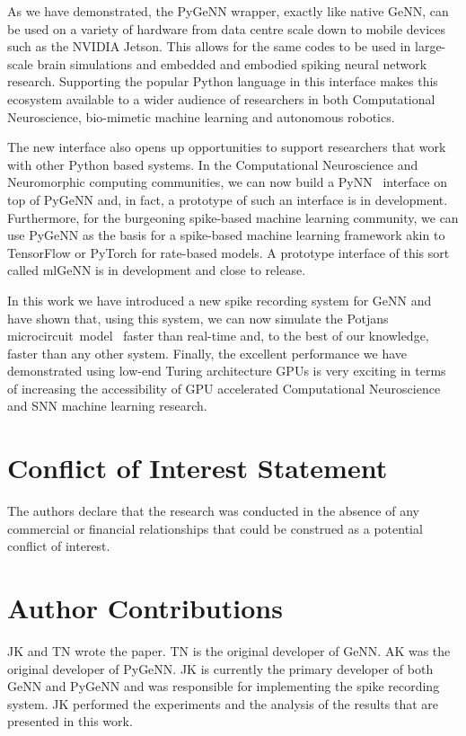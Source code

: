 \documentclass[utf8]{frontiersSCNS} %
\begin{document}
As we have demonstrated, the PyGeNN wrapper, exactly like native GeNN, can be used on a variety of hardware from data centre scale down to mobile devices such as the NVIDIA Jetson.
This allows for the same codes to be used in large-scale brain simulations and embedded and embodied spiking neural network research.
Supporting the popular Python language in this interface makes this ecosystem available to a wider audience of researchers in both Computational Neuroscience, bio-mimetic machine learning and autonomous robotics.

The new interface also opens up opportunities to support researchers that work with other Python based systems.
In the Computational Neuroscience and Neuromorphic computing communities, we can now build a PyNN~\citep{Davison2008} interface on top of PyGeNN and, in fact, a prototype of such an interface is in development.
Furthermore, for the burgeoning spike-based machine learning community, we can use PyGeNN as the basis for a spike-based machine learning framework akin to TensorFlow or PyTorch for rate-based models.
A prototype interface of this sort called mlGeNN is in development and close to release.

In this work we have introduced a new spike recording system for GeNN and have shown that, using this system, we can now simulate the Potjans microcircuit~model~\citep{Potjans2012} faster than real-time and, to the best of our knowledge, faster than any other system.
Finally, the excellent performance we have demonstrated using low-end Turing architecture GPUs is very exciting in terms of increasing the accessibility of GPU accelerated Computational Neuroscience and SNN machine learning research.

\section*{Conflict of Interest Statement}
The authors declare that the research was conducted in the absence of any commercial or financial relationships that could be construed as a potential conflict of interest.

\section*{Author Contributions}
JK and TN wrote the paper.
TN is the original developer of GeNN.
AK was the original developer of PyGeNN.
JK is currently the primary developer of both GeNN and PyGeNN and was responsible for implementing the spike recording system.
JK performed the experiments and the analysis of the results that are presented in this work.
\end{document}
